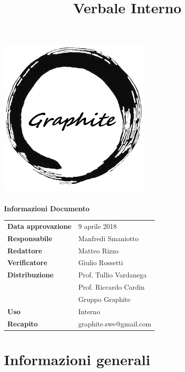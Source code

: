 \documentclass[openany,12pt,a4paper]{article}
\title{Verbale Interno}
\author{}
\begin{document}
 
  \makeatletter 
  \begin{titlepage} 
    \setlength{\headsep}{0pt}   
    \begin{center} 
      \includegraphics[width=0.5\linewidth]{Logo.png}\\[1em] 
      {\huge \bfseries  \@title }\\[10ex] 
      \textbf{\Large Informazioni Documento} \\[2em] 
      \bgroup 
      \def\arraystretch{1.5} 
      \begin{tabular}{l|l} 
        \textbf{Data approvazione} & 9 aprile 2018 \\ 
        \textbf{Responsabile} & Manfredi Smaniotto \\ 
        \textbf{Redattore} & Matteo Rizzo \\ 
        \textbf{Verificatore} & Giulio Rossetti \\ 
        \textbf{Distribuzione} & Prof. Tullio Vardanega \\ 
         & Prof. Riccardo Cardin \\ 
         & Gruppo Graphite \\ 
        \textbf{Uso} & Interno \\ 
        \textbf{Recapito} & graphite.swe@gmail.com \\ 
      \end{tabular} 
    \egroup 
    \end{center} 
  \end{titlepage} 
  \makeatother 
 
  \thispagestyle{empty} 
  \newpage 
   
  \tableofcontents 
  \newpage 
   
  \section{Informazioni generali} 
   
\end{document}
